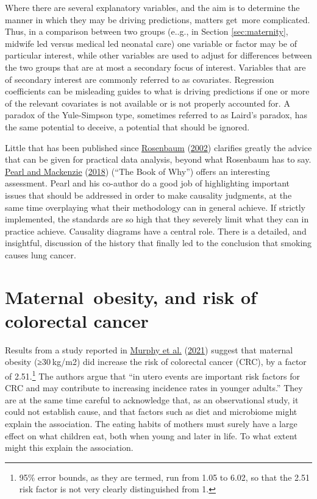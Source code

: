 \documentclass[
  10pt,
  b5paper]{book}
\begin{document}
Where there are several explanatory variables, and the aim is
to determine the manner in which they may be driving predictions,
matters get~more complicated. Thus, in a comparison between
two groups (e..g., in Section \ref{sec:maternity}, midwife led
versus medical led neonatal care) one variable or factor may
be of particular interest, while other variables are used to
adjust for differences between the two groups that are at
most a secondary focus of interest. Variables that are of
secondary interest are commonly referred to as covariates.
Regression coefficients can be misleading guides to what is
driving predictions if one or more of the relevant covariates
is not available or is not properly accounted for. A paradox
of the Yule-Simpson type, sometimes referred to as Laird's
paradox, has the same potential to deceive, a potential that
should be ignored.

Little that has been published since \protect\hyperlink{ref-RosBook}{Rosenbaum} (\protect\hyperlink{ref-RosBook}{2002}) clarifies greatly the
advice that can be given for practical data analysis, beyond what
Rosenbaum has to say. \protect\hyperlink{ref-pearl2018book}{Pearl and Mackenzie} (\protect\hyperlink{ref-pearl2018book}{2018}) (``The Book of Why'') offers an
interesting assessment. Pearl and his co-author do a good job of
highlighting important issues that should be addressed in order to
make causality judgments, at the same time overplaying what their
methodology can in general achieve. If strictly implemented,
the standards are so high that they severely limit what they can
in practice achieve. Causality diagrams have a central role.
There is a detailed, and insightful, discussion of the history
that finally led to the conclusion that smoking causes lung cancer.

\hypertarget{maternal-obesity-and-risk-of-colorectal-cancer}{%
\section{Maternal~obesity, and risk of colorectal cancer}\label{maternal-obesity-and-risk-of-colorectal-cancer}}

Results from a study reported in \protect\hyperlink{ref-Murphygutjnl-2021-325001}{Murphy et al.} (\protect\hyperlink{ref-Murphygutjnl-2021-325001}{2021}) suggest
that maternal obesity (≥30 kg/m2) did increase the risk of
colorectal cancer (CRC), by a factor of 2.51.\footnote{95\%
  error bounds, as they are termed, run from 1.05 to 6.02,
  so that the 2.51 risk factor is not very clearly distinguished
  from 1.} The authors argue that ``in utero events are important
risk factors for CRC and may contribute to increasing incidence
rates in younger adults.'' They are at the same time careful to
acknowledge that, as an observational study, it could not
establish cause, and that factors such as diet and microbiome
might explain the association. The eating habits of mothers
must surely have a large effect on what children eat, both when
young and later in life. To what extent might this explain
the association.
\end{document}
